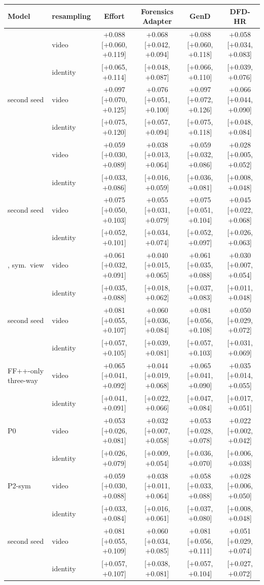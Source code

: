 \begin{tabular}{@{}l l cccc@{}}
\toprule
Model & resampling & Effort & Forensics Adapter & GenD & DFD-HR \\
\midrule
\oursB{} & video & +0.088 [+0.060, +0.119] & +0.068 [+0.042, +0.094] & +0.088 [+0.060, +0.118] & +0.058 [+0.034, +0.083] \\
 & identity & [+0.065, +0.114] & [+0.048, +0.087] & [+0.066, +0.110] & [+0.039, +0.076] \\
\quad second seed & video & +0.097 [+0.070, +0.125] & +0.076 [+0.051, +0.100] & +0.097 [+0.072, +0.126] & +0.066 [+0.044, +0.090] \\
 & identity & [+0.075, +0.120] & [+0.057, +0.094] & [+0.075, +0.118] & [+0.048, +0.084] \\
\oursF{} & video & +0.059 [+0.030, +0.089] & +0.038 [+0.013, +0.064] & +0.059 [+0.032, +0.086] & +0.028 [+0.005, +0.052] \\
 & identity & [+0.033, +0.086] & [+0.016, +0.059] & [+0.036, +0.081] & [+0.008, +0.048] \\
\quad second seed & video & +0.075 [+0.050, +0.103] & +0.055 [+0.031, +0.079] & +0.075 [+0.051, +0.104] & +0.045 [+0.022, +0.068] \\
 & identity & [+0.052, +0.101] & [+0.034, +0.074] & [+0.052, +0.097] & [+0.026, +0.063] \\
\oursF{}, sym.\ view & video & +0.061 [+0.032, +0.091] & +0.040 [+0.015, +0.065] & +0.061 [+0.035, +0.088] & +0.030 [+0.007, +0.054] \\
 & identity & [+0.035, +0.088] & [+0.018, +0.062] & [+0.037, +0.083] & [+0.011, +0.048] \\
\quad second seed & video & +0.081 [+0.055, +0.107] & +0.060 [+0.036, +0.084] & +0.081 [+0.056, +0.108] & +0.050 [+0.029, +0.072] \\
 & identity & [+0.057, +0.105] & [+0.039, +0.081] & [+0.057, +0.103] & [+0.031, +0.069] \\
\midrule
FF++-only three-way & video & +0.065 [+0.041, +0.092] & +0.044 [+0.019, +0.068] & +0.065 [+0.041, +0.090] & +0.035 [+0.014, +0.055] \\
 & identity & [+0.041, +0.091] & [+0.022, +0.066] & [+0.047, +0.084] & [+0.017, +0.051] \\
P0 & video & +0.053 [+0.026, +0.081] & +0.032 [+0.007, +0.058] & +0.053 [+0.028, +0.078] & +0.022 [+0.002, +0.042] \\
 & identity & [+0.026, +0.079] & [+0.009, +0.054] & [+0.036, +0.070] & [+0.006, +0.038] \\
P2-sym & video & +0.059 [+0.030, +0.088] & +0.038 [+0.011, +0.064] & +0.058 [+0.033, +0.088] & +0.028 [+0.006, +0.050] \\
 & identity & [+0.033, +0.084] & [+0.016, +0.061] & [+0.037, +0.080] & [+0.008, +0.048] \\
\quad second seed & video & +0.081 [+0.055, +0.109] & +0.060 [+0.034, +0.085] & +0.081 [+0.056, +0.111] & +0.051 [+0.029, +0.074] \\
 & identity & [+0.057, +0.107] & [+0.038, +0.081] & [+0.057, +0.104] & [+0.027, +0.072] \\
\bottomrule
\end{tabular}
